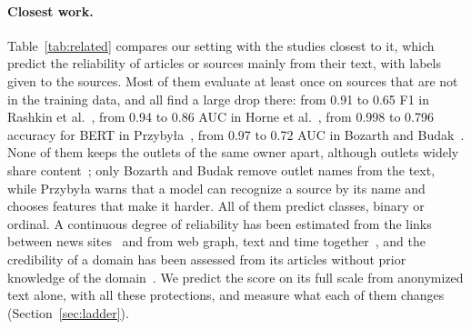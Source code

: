 \documentclass[11pt,a4paper]{article}
\begin{document}
\paragraph{Closest work.}
Table~\ref{tab:related} compares our setting with the studies closest to it, which predict the reliability of articles
or sources mainly from their text, with labels given to the sources. Most of them evaluate at least once on sources that
are not in the training data, and all find a large drop there: from 0.91 to 0.65 F1 in Rashkin et
al.~\cite{rashkin2017truth}, from 0.94 to 0.86 AUC in Horne et al.~\cite{horne2019robust}, from 0.998 to 0.796 accuracy
for BERT in Przyby{\l}a~\cite{przybyla2020capturing}, from 0.97 to 0.72 AUC in Bozarth and Budak~\cite{bozarth2020toward}.
None of them keeps the outlets of the same owner apart, although outlets widely share content~\cite{horne2019spirals};
only Bozarth and Budak remove outlet names from the text, while Przyby{\l}a warns that a model can recognize a source by
its name and chooses features that make it harder. All of them predict classes, binary or ordinal. A continuous degree of reliability has been estimated from the links
between news sites~\cite{burdisso-etal-2024-reliability} and from web graph, text and time
together~\cite{kondrup2026credibench}, and the credibility of a domain has been assessed from its articles without prior
knowledge of the domain~\cite{eldifrawi2026temporal}. We predict the score on its full scale from anonymized text
alone, with all these protections, and measure what each of them changes
(Section~\ref{sec:ladder}).
\end{document}
